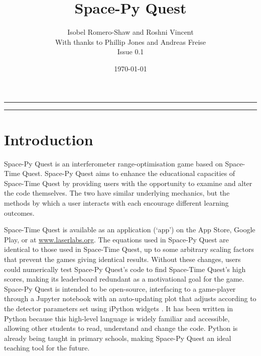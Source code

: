 \documentclass{article}
\title{Space-Py Quest}
\author{Isobel Romero-Shaw and Roshni Vincent \\
{\small With thanks to Phillip Jones and Andreas Freise} \\
Issue 0.1}
\date{\today}
\begin{document}
\maketitle
\hrule
\tableofcontents
\hrule
\clearpage

\section{Introduction}
\label{sec:introduction}
Space-Py Quest is an interferometer range-optimisation game based on Space-Time Quest. Space-Py Quest aims to enhance the educational capacities of Space-Time Quest by providing users with the opportunity to examine and alter the code themselves. The two have similar underlying mechanics, but the methods by which a user interacts with each encourage different learning outcomes. 
\par
Space-Time Quest is available as an application (`app') on the App Store, Google Play, or at \url{www.laserlabs.org}. The equations used in Space-Py Quest are identical to those used in Space-Time Quest, up to some arbitrary scaling factors that prevent the games giving identical results. Without these changes, users could numerically test Space-Py Quest's code to find Space-Time Quest's high scores, making its leaderboard redundant as a motivational goal for the game. Space-Py Quest is intended to be open-source, interfacing to a game-player through a Jupyter notebook \cite{jupyter} with an auto-updating plot that adjusts according to the detector parameters set using iPython widgets \cite{ipy}. It has been written in Python because this high-level language is widely familiar and accessible, allowing other students to read, understand and change the code. Python is already being taught in primary schools, making Space-Py Quest an ideal teaching tool for the future.
\end{document}

